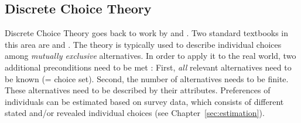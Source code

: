 \begin{oframed}
%
%
\subsection{Discrete Choice Theory}
\label{ch:economicEval:describingBehavior:discreteChoice}
%
%

\label{ch:economicEval:describingBehavior:discreteChoice:foundations}
%
Discrete Choice Theory goes back to work by \citet{Luce1965PreferenceUtility} and \citet{McFadden1975DiscreteChoiceModel}. Two standard textbooks in this area are \citet{Ben-AkivaBook} and \citet{Train2003discreteChoiceBook}. The theory is typically used to describe individual choices among \emph{mutually exclusive} alternatives. In order to apply it to the real world, two additional preconditions need to be met \citep[p.16]{Train2003discreteChoiceBook}:
%
First, \emph{all} relevant alternatives need to be known (= choice set).
%
Second, the number of alternatives needs to be finite.
%
These alternatives need to be described by their attributes.
%
Preferences of individuals can be estimated based on survey data, which consists of different stated and/or revealed individual choices (see Chapter~\ref{sec:estimation}).
%


\end{oframed}
